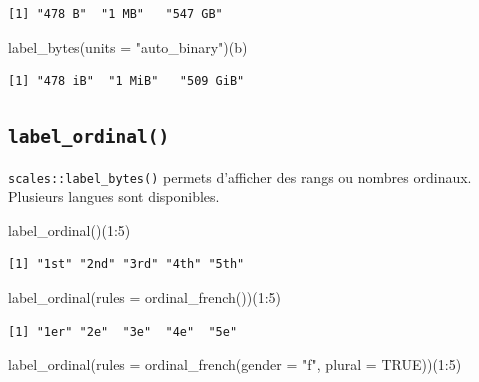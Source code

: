 \documentclass[
  letterpaper,
  DIV=11,
  numbers=noendperiod,
  oneside]{scrreprt}
\newenvironment{Shaded}{\begin{snugshade}}{\end{snugshade}}
\newcommand{\AttributeTok}[1]{\textcolor[rgb]{0.40,0.45,0.13}{#1}}
\newcommand{\ConstantTok}[1]{\textcolor[rgb]{0.56,0.35,0.01}{#1}}
\newcommand{\DecValTok}[1]{\textcolor[rgb]{0.68,0.00,0.00}{#1}}
\newcommand{\FunctionTok}[1]{\textcolor[rgb]{0.28,0.35,0.67}{#1}}
\newcommand{\NormalTok}[1]{\textcolor[rgb]{0.00,0.23,0.31}{#1}}
\newcommand{\SpecialCharTok}[1]{\textcolor[rgb]{0.37,0.37,0.37}{#1}}
\newcommand{\StringTok}[1]{\textcolor[rgb]{0.13,0.47,0.30}{#1}}
\begin{document}
\begin{verbatim}
[1] "478 B"  "1 MB"   "547 GB"
\end{verbatim}

\begin{Shaded}
\begin{Highlighting}[]
\FunctionTok{label\_bytes}\NormalTok{(}\AttributeTok{units =} \StringTok{"auto\_binary"}\NormalTok{)(b)}
\end{Highlighting}
\end{Shaded}

\begin{verbatim}
[1] "478 iB"  "1 MiB"   "509 GiB"
\end{verbatim}

\hypertarget{label_ordinal}{%
\subsection{\texorpdfstring{\texttt{label\_ordinal()}}{label\_ordinal()}}\label{label_ordinal}}

\texttt{scales::label\_bytes()} permets d'afficher des rangs ou nombres
ordinaux. Plusieurs langues sont disponibles.

\begin{Shaded}
\begin{Highlighting}[]
\FunctionTok{label\_ordinal}\NormalTok{()(}\DecValTok{1}\SpecialCharTok{:}\DecValTok{5}\NormalTok{)}
\end{Highlighting}
\end{Shaded}

\begin{verbatim}
[1] "1st" "2nd" "3rd" "4th" "5th"
\end{verbatim}

\begin{Shaded}
\begin{Highlighting}[]
\FunctionTok{label\_ordinal}\NormalTok{(}\AttributeTok{rules =} \FunctionTok{ordinal\_french}\NormalTok{())(}\DecValTok{1}\SpecialCharTok{:}\DecValTok{5}\NormalTok{)}
\end{Highlighting}
\end{Shaded}

\begin{verbatim}
[1] "1er" "2e"  "3e"  "4e"  "5e" 
\end{verbatim}

\begin{Shaded}
\begin{Highlighting}[]
\FunctionTok{label\_ordinal}\NormalTok{(}\AttributeTok{rules =} \FunctionTok{ordinal\_french}\NormalTok{(}\AttributeTok{gender =} \StringTok{"f"}\NormalTok{, }\AttributeTok{plural =} \ConstantTok{TRUE}\NormalTok{))(}\DecValTok{1}\SpecialCharTok{:}\DecValTok{5}\NormalTok{)}
\end{Highlighting}
\end{Shaded}
\end{document}
